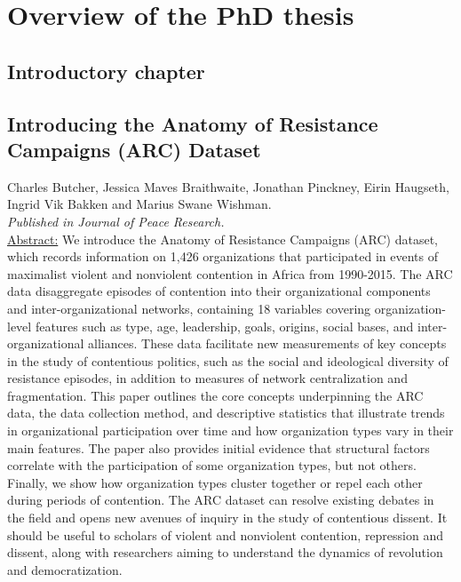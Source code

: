 \documentclass[12pt]{article}
\begin{document}
\section*{Overview of the PhD thesis}

\subsection*{Introductory chapter}

\subsection*{Introducing the Anatomy of Resistance Campaigns (ARC) Dataset}

Charles Butcher, Jessica Maves Braithwaite, Jonathan Pinckney, Eirin Haugseth,
Ingrid Vik Bakken and Marius Swane Wishman.\\

\textit{Published in Journal of Peace Research.}\\

\underline{Abstract:} We introduce the Anatomy of Resistance Campaigns (ARC)
dataset, which records information on 1,426 organizations that participated in
events of maximalist violent and nonviolent contention in Africa from 1990-2015.
The ARC data disaggregate episodes of contention into their organizational
components and inter-organizational networks, containing 18 variables covering
organization-level features such as type, age, leadership, goals, origins,
social bases, and inter-organizational alliances. These data facilitate new
measurements of key concepts in the study of contentious politics, such as the
social and ideological diversity of resistance episodes, in addition to measures
of network centralization and fragmentation. This paper outlines the core
concepts underpinning the ARC data, the data collection method, and descriptive
statistics that illustrate trends in organizational participation over time and
how organization types vary in their main features. The paper also provides
initial evidence that structural factors correlate with the participation of
some organization types, but not others. Finally, we show how organization types
cluster together or repel each other during periods of contention. The ARC
dataset can resolve existing debates in the field and opens new avenues of
inquiry in the study of contentious dissent. It should be useful to scholars of
violent and nonviolent contention, repression and dissent, along with
researchers aiming to understand the dynamics of revolution and democratization. 
\end{document}
